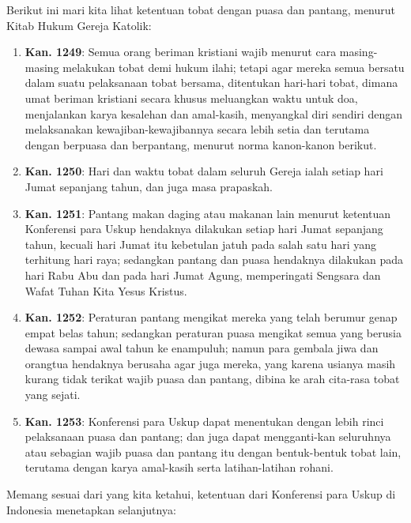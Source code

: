 Berikut ini mari kita lihat ketentuan tobat dengan puasa dan pantang, menurut Kitab Hukum Gereja Katolik:
\begin{enumerate}
\item \textbf{Kan. 1249}:  Semua orang beriman kristiani wajib menurut cara masing-masing melakukan tobat demi hukum ilahi; tetapi agar mereka semua bersatu dalam suatu pelaksanaan tobat bersama, ditentukan hari-hari tobat, dimana umat beriman kristiani secara khusus meluangkan waktu untuk doa, menjalankan karya kesalehan dan amal-kasih, menyangkal diri sendiri dengan melaksanakan kewajiban-kewajibannya secara lebih setia dan terutama dengan berpuasa dan berpantang, menurut norma kanon-kanon berikut.

\item \textbf{Kan. 1250}: Hari dan waktu tobat dalam seluruh Gereja ialah setiap hari Jumat sepanjang tahun, dan juga masa prapaskah.

\item \textbf{Kan. 1251}: Pantang makan daging atau makanan lain menurut ketentuan Konferensi para Uskup hendaknya dilakukan setiap hari Jumat sepanjang tahun, kecuali hari Jumat itu kebetulan jatuh pada salah satu hari yang terhitung hari raya; sedangkan pantang dan puasa hendaknya dilakukan pada hari Rabu Abu dan pada hari Jumat Agung, memperingati Sengsara dan Wafat Tuhan Kita Yesus Kristus.

\item \textbf{Kan. 1252}: Peraturan pantang mengikat mereka yang telah berumur genap empat belas tahun; sedangkan peraturan puasa mengikat semua yang berusia dewasa sampai awal tahun ke enampuluh; namun para gembala jiwa dan orangtua hendaknya berusaha agar juga mereka, yang karena usianya masih kurang tidak terikat wajib puasa dan pantang, dibina ke arah cita-rasa tobat yang sejati.

\item \textbf{Kan. 1253}: Konferensi para Uskup dapat menentukan dengan lebih rinci pelaksanaan puasa dan pantang; dan juga dapat mengganti-kan seluruhnya atau sebagian wajib puasa dan pantang itu dengan bentuk-bentuk tobat lain, terutama dengan karya amal-kasih serta latihan-latihan rohani.
\end{enumerate}

Memang sesuai dari yang kita ketahui, ketentuan dari Konferensi para Uskup di Indonesia menetapkan selanjutnya:

